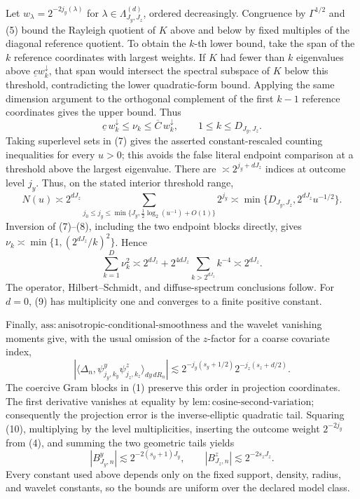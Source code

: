 Let \(w_\lambda=2^{-2j_y(\lambda)}\) for \(\lambda\in\Lambda_{J_y,J_z}^{(d)}\), ordered decreasingly. Congruence by \(\Gamma^{1/2}\) and (5) bound the Rayleigh quotient of \(K\) above and below by fixed multiples of the diagonal reference quotient. To obtain the \(k\)-th lower bound, take the span of the \(k\) reference coordinates with largest weights. If \(K\) had fewer than \(k\) eigenvalues above \(\underline c w_k^\downarrow\), that span would intersect the spectral subspace of \(K\) below this threshold, contradicting the lower quadratic-form bound. Applying the same dimension argument to the orthogonal complement of the first \(k-1\) reference coordinates gives the upper bound. Thus
\[
\underline c\,w_k^\downarrow\le\nu_k\le\overline C\,w_k^\downarrow,
\qquad 1\le k\le D_{J_y,J_z}.                                      \tag{7}
\]
Taking superlevel sets in (7) gives the asserted constant-rescaled counting inequalities for every \(u>0\); this avoids the false literal endpoint comparison at a threshold above the largest eigenvalue. There are \(\asymp2^{j_y+dJ_z}\) indices at outcome level \(j_y\). Thus, on the stated interior threshold range,
\[
N(u)\asymp2^{dJ_z}\sum_{j_0\le j_y\le\min\{J_y,\frac12\log_2(u^{-1})+O(1)\}}2^{j_y}
\asymp\min\{D_{J_y,J_z},2^{dJ_z}u^{-1/2}\}.                       \tag{8}
\]
Inversion of (7)--(8), including the two endpoint blocks directly, gives \(\nu_k\asymp\min\{1,(2^{dJ_z}/k)^2\}\). Hence
\[
\sum_{k=1}^{D}\nu_k^2
\asymp2^{dJ_z}+2^{4dJ_z}\sum_{k>2^{dJ_z}}k^{-4}\asymp2^{dJ_z}.      \tag{9}
\]
The operator, Hilbert--Schmidt, and diffuse-spectrum conclusions follow. For \(d=0\), (9) has multiplicity one and converges to a finite positive constant.

Finally, \(\mathrm{ass{:}anisotropic\text{-}conditional\text{-}smoothness}\) and the wavelet vanishing moments give, with the usual omission of the \(z\)-factor for a coarse covariate index,
\[
|\langle\Delta_n,\psi^y_{j_y,k_y}\psi^z_{j_z,k_z}\rangle_{dy\,dR_n}|
\lesssim2^{-j_y(s_y+1/2)}2^{-j_z(s_z+d/2)}.                          \tag{10}
\]
The coercive Gram blocks in (1) preserve this order in projection coordinates. The first derivative vanishes at equality by \(\mathrm{lem{:}cosine\text{-}second\text{-}variation}\); consequently the projection error is the inverse-elliptic quadratic tail. Squaring (10), multiplying by the level multiplicities, inserting the outcome weight \(2^{-2j_y}\) from (4), and summing the two geometric tails yields
\[
|B^y_{J_y,n}|\lesssim2^{-2(s_y+1)J_y},
\qquad |B^z_{J_z,n}|\lesssim2^{-2s_zJ_z}.
\]
Every constant used above depends only on the fixed support, density, radius, and wavelet constants, so the bounds are uniform over the declared model class.